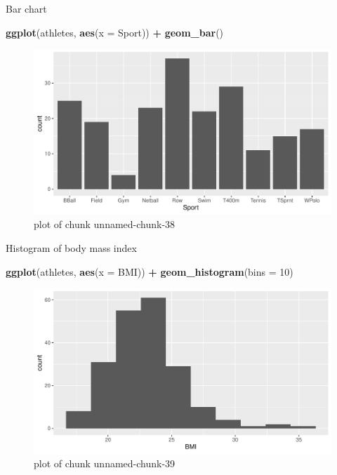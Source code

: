 \documentclass[
  ignorenonframetext,
]{beamer}
\newenvironment{Shaded}{\begin{snugshade}}{\end{snugshade}}
\newcommand{\DataTypeTok}[1]{\textcolor[rgb]{0.13,0.29,0.53}{#1}}
\newcommand{\DecValTok}[1]{\textcolor[rgb]{0.00,0.00,0.81}{#1}}
\newcommand{\KeywordTok}[1]{\textcolor[rgb]{0.13,0.29,0.53}{\textbf{#1}}}
\newcommand{\NormalTok}[1]{#1}
\newcommand{\OperatorTok}[1]{\textcolor[rgb]{0.81,0.36,0.00}{\textbf{#1}}}
\newcommand{\StringTok}[1]{\textcolor[rgb]{0.31,0.60,0.02}{#1}}
\begin{document}
\begin{frame}[fragile]{Bar chart}
\protect\hypertarget{bar-chart}{}

\begin{Shaded}
\begin{Highlighting}[]
\KeywordTok{ggplot}\NormalTok{(athletes, }\KeywordTok{aes}\NormalTok{(}\DataTypeTok{x =}\NormalTok{ Sport)) }\OperatorTok{+}\StringTok{ }\KeywordTok{geom_bar}\NormalTok{()}
\end{Highlighting}
\end{Shaded}

\begin{figure}
\centering
\includegraphics{figure/unnamed-chunk-38-1.pdf}
\caption{plot of chunk unnamed-chunk-38}
\end{figure}

\end{frame}

\begin{frame}[fragile]{Histogram of body mass index}
\protect\hypertarget{histogram-of-body-mass-index}{}

\begin{Shaded}
\begin{Highlighting}[]
\KeywordTok{ggplot}\NormalTok{(athletes, }\KeywordTok{aes}\NormalTok{(}\DataTypeTok{x =}\NormalTok{ BMI)) }\OperatorTok{+}\StringTok{ }\KeywordTok{geom_histogram}\NormalTok{(}\DataTypeTok{bins =} \DecValTok{10}\NormalTok{)}
\end{Highlighting}
\end{Shaded}

\begin{figure}
\centering
\includegraphics{figure/unnamed-chunk-39-1.pdf}
\caption{plot of chunk unnamed-chunk-39}
\end{figure}

\end{frame}
\end{document}

